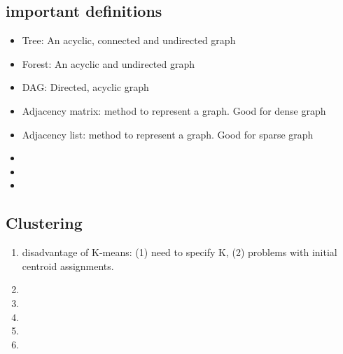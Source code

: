 \documentclass[12pt, landscape]{article}
\begin{document}
\begin{multicols}{2}
\subsection{important definitions}
\begin{itemize}
\item Tree: An acyclic, connected and undirected graph
\item Forest: An acyclic and undirected graph 
\item DAG: Directed, acyclic graph
\item Adjacency matrix: method to represent a graph. Good for dense graph
\item Adjacency list: method to represent a graph. Good for sparse graph
\item
\item
\item
\end{itemize}

\subsection{Clustering}
\begin{enumerate}
	\item disadvantage of K-means: (1) need to specify K, (2) problems with initial centroid assignments. 
	\item
	\item
	\item
	\item
	\item
\end{enumerate}


\end{multicols}
\end{document}
